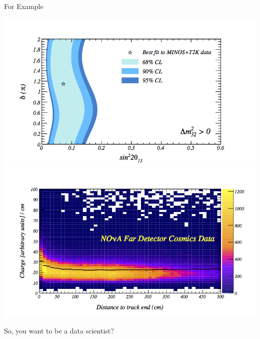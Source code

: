 \documentclass{beamer}
\begin{document}
\begin{frame}{For Example}
\begin{center}
\includegraphics[scale=0.25]{pics/both_sd_normal.png}\hspace{1cm}
\includegraphics[scale=0.25]{pics/new_dEdx.png}
\end{center}
\end{frame}


\begin{frame}{So, you want to be a data scientist?}


\end{frame}
\end{document}
